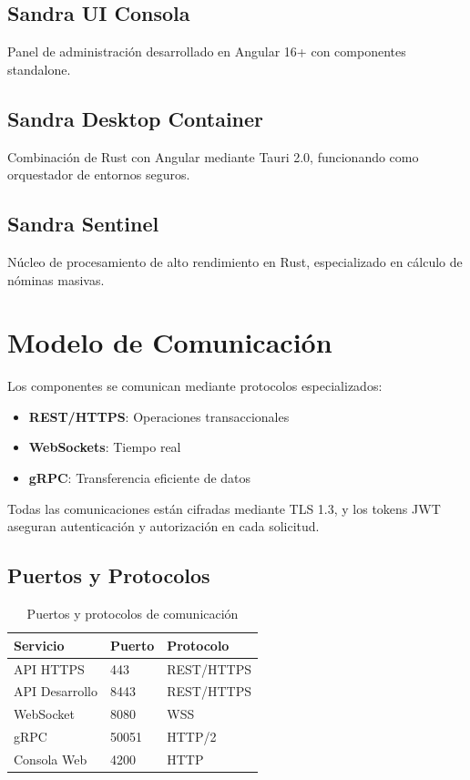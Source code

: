 \subsection{Sandra UI Consola}
Panel de administraci\'on desarrollado en Angular 16+ con componentes standalone.

\subsection{Sandra Desktop Container}
Combinaci\'on de Rust con Angular mediante Tauri 2.0, funcionando como orquestador de entornos seguros.

\subsection{Sandra Sentinel}
N\'ucleo de procesamiento de alto rendimiento en Rust, especializado en c\'alculo de n\'ominas masivas.

\section{Modelo de Comunicaci\'on}

Los componentes se comunican mediante protocolos especializados:

\begin{itemize}
\item \textbf{REST/HTTPS}: Operaciones transaccionales
\item \textbf{WebSockets}: Tiempo real
\item \textbf{gRPC}: Transferencia eficiente de datos
\end{itemize}

Todas las comunicaciones est\'an cifradas mediante TLS 1.3, y los tokens JWT aseguran autenticaci\'on y autorizaci\'on en cada solicitud.

\subsection{Puertos y Protocolos}

\begin{table}[H]
\centering
\caption{Puertos y protocolos de comunicaci\'on}
\begin{tabular}{|l|l|l|}
\hline
\textbf{Servicio} & \textbf{Puerto} & \textbf{Protocolo} \\ \hline
API HTTPS & 443 & REST/HTTPS \\ \hline
API Desarrollo & 8443 & REST/HTTPS \\ \hline
WebSocket & 8080 & WSS \\ \hline
gRPC & 50051 & HTTP/2 \\ \hline
Consola Web & 4200 & HTTP \\ \hline
\end{tabular}
\end{table}

\newpage
